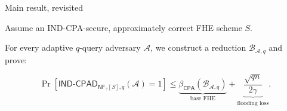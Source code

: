 \begin{frame}{Main result, revisited}
  \relax
  {\small Assume an IND-CPA-secure, approximately correct FHE scheme $S$.\par}
  \medskip
  {\small For every adaptive $q$-query adversary $\mathcal A$, we construct
  a reduction $\mathcal B_{\mathcal A,q}$ and prove:\par}
  \vspace{0.25em}
  \[
    \Pr\!\left[
      \mathsf{IND\text{-}CPAD}_{\mathsf{NF}_{\gamma}[S],q}(\mathcal A)=1
    \right]
    \leq
    \underbrace{\beta_{\mathsf{CPA}}(\mathcal B_{\mathcal A,q})}_{\text{base FHE}}
    +\underbrace{\frac{\sqrt{qn}}{2\gamma}}_{\text{flooding loss}}.
  \]
  \pause
  \vspace{0.65em}
\end{frame}
